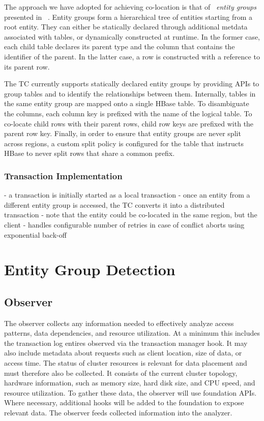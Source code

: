 \documentclass[10pt,final,journal]{IEEEtran}
\begin{document}
The approach we have adopted for achieving co-location is that of ~\emph{entity groups} presented in ~\cite{Baker:2011:8530095}. Entity groups form a hierarchical tree of entities starting from a root entity. They can either be statically declared through additional metdata associated with tables, or dynamically constructed at runtime. In the former case, each child table declares its parent type and the column that contains the identifier of the parent. In the latter case, a row is constructed with a reference to its parent row.

The TC currently supports statically declared entity groups by providing APIs to group tables and to identify the relationships between them. Internally, tables in the same entity group are mapped onto a single HBase table. To disambiguate the columns, each column key is prefixed with the name of the logical table. To co-locate child rows with their parent rows, child row keys are prefixed with the parent row key. Finally, in order to ensure that entity groups are never split across regions, a custom split policy is configured for the table that instructs HBase to never split rows that share a common prefix.

\subsubsection{Transaction Implementation}
- a transaction is initially started as a local transaction
- once an entity from a different entity group is accessed, the TC converts it into a distributed transaction
- note that the entity could be co-located in the same region, but the client 
- handles configurable number of retries in case of conflict aborts using exponential back-off


\section{Entity Group Detection}

\subsection{Observer}
The observer collects any information needed to effectively analyze access patterns, data dependencies, and resource utilization. At a minimum this includes the transaction log entires observed via the transaction manager hook. It may also include metadata about requests such as client location, size of data, or access time. The status of cluster resources is relevant for data placement and must therefore also be collected. It consists of the current cluster topology, hardware information, such as memory size, hard disk size, and CPU speed, and resource utilization. To gather these data, the observer will use foundation APIs. Where necessary, additional hooks will be added to the foundation to expose relevant data. The observer feeds collected information into the analyzer.
\end{document}
